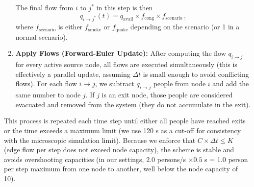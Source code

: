 \documentclass[11pt,a4paper]{article}
\begin{document}
\begin{enumerate}
\begin{itemize}
        \end{itemize}
        The final flow from $i$ to $j^*$ in this step is then 
        \[
           q_{i\to j^*}(t) = q_{\text{avail}} \times f_{\text{cong}} \times f_{\text{scenario}}\,,
        \] 
        where $f_{\text{scenario}}$ is either $f_{\text{smoke}}$ or $f_{\text{quake}}$ depending on the scenario (or 1 in a normal scenario).
    \item \textbf{Apply Flows (Forward-Euler Update):} After computing the flow $q_{i\to j}$ for every active source node, all flows are executed simultaneously (this is effectively a parallel update, assuming $\Delta t$ is small enough to avoid conflicting flows). For each flow $i\to j$, we subtract $q_{i\to j}$ people from node $i$ and add the same number to node $j$. If $j$ is an exit node, those people are considered evacuated and removed from the system (they do not accumulate in the exit).
\end{enumerate}

This process is repeated each time step until either all people have reached exits or the time exceeds a maximum limit (we use 120 s as a cut-off for consistency with the microscopic simulation limit). Because we enforce that $C \times \Delta t \le K$ (edge flow per step does not exceed node capacity), the scheme is stable and avoids overshooting capacities (in our settings, $2.0$ persons/s $\times 0.5$ s = 1.0 person per step maximum from one node to another, well below the node capacity of 10).
\end{document}
